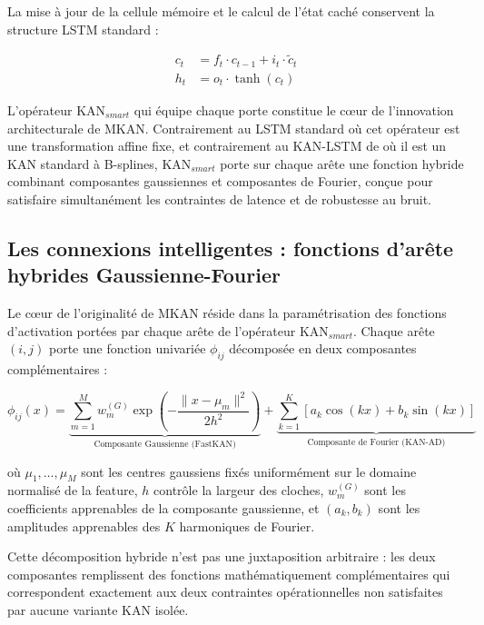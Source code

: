 \documentclass[11pt,a4paper,oneside]{report}
\theoremstyle{definition}
\theoremstyle{remark}
\begin{document}
La mise à jour de la cellule mémoire et le calcul de l'état caché conservent la structure LSTM standard :

\begin{align}
    c_t &= f_t \cdot c_{t-1} + i_t \cdot \tilde{c}_t \\
    h_t &= o_t \cdot \tanh(c_t)
\end{align}

L'opérateur $\text{KAN}_{smart}$ qui équipe chaque porte constitue le cœur de l'innovation architecturale de MKAN. Contrairement au LSTM standard où cet opérateur est une transformation affine fixe, et contrairement au KAN-LSTM de \citet{Zhu2025} où il est un KAN standard à B-splines, $\text{KAN}_{smart}$ porte sur chaque arête une fonction hybride combinant composantes gaussiennes et composantes de Fourier, conçue pour satisfaire simultanément les contraintes de latence et de robustesse au bruit.

\subsection{Les connexions intelligentes : fonctions d'arête hybrides Gaussienne-Fourier}

Le cœur de l'originalité de MKAN réside dans la paramétrisation des fonctions d'activation portées par chaque arête de l'opérateur $\text{KAN}_{smart}$. Chaque arête $(i,j)$ porte une fonction univariée $\phi_{ij}$ décomposée en deux composantes complémentaires :

\begin{equation}
    \phi_{ij}(x) =
    \underbrace{\sum_{m=1}^{M} w_m^{(G)} \exp\!\left(-\frac{\|x - \mu_m\|^2}{2h^2}\right)}_{\text{Composante Gaussienne (FastKAN)}}
    +
    \underbrace{\sum_{k=1}^{K} \left[a_k \cos(kx) + b_k \sin(kx)\right]}_{\text{Composante de Fourier (KAN-AD)}}
\end{equation}

où $\mu_1, \ldots, \mu_M$ sont les centres gaussiens fixés uniformément sur le domaine normalisé de la feature, $h$ contrôle la largeur des cloches, $w_m^{(G)}$ sont les coefficients apprenables de la composante gaussienne, et $(a_k, b_k)$ sont les amplitudes apprenables des $K$ harmoniques de Fourier.

Cette décomposition hybride n'est pas une juxtaposition arbitraire : les deux composantes remplissent des fonctions mathématiquement complémentaires qui correspondent exactement aux deux contraintes opérationnelles non satisfaites par aucune variante KAN isolée.
\end{document}
